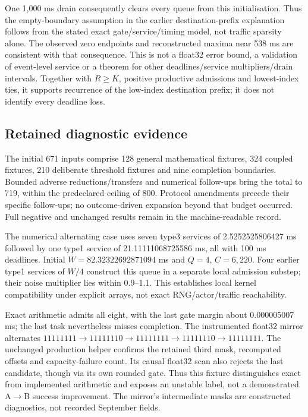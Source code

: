 \documentclass[12pt,a4paper]{article}
\begin{document}
One 1,000 ms drain consequently clears every queue from this initialisation. Thus the empty-boundary assumption in the earlier destination-prefix explanation follows from the stated exact gate/service/timing model, not traffic sparsity alone. The observed zero endpoints and reconstructed maxima near 538 ms are consistent with that consequence. This is not a float32 error bound, a validation of event-level service or a theorem for other deadlines/service multipliers/drain intervals. Together with $R\geq K$, positive productive admissions and lowest-index ties, it supports recurrence of the low-index destination prefix; it does not identify every deadline loss.

\FloatBarrier
\subsection{Retained diagnostic evidence}\label{sec:C.6}

The initial 671 inputs comprise 128 general mathematical fixtures, 324 coupled fixtures, 210 deliberate threshold fixtures and nine completion boundaries. Bounded adverse reductions/transfers and numerical follow-ups bring the total to 719, within the predeclared ceiling of 800. Protocol amendments precede their specific follow-ups; no outcome-driven expansion beyond that budget occurred. Full negative and unchanged results remain in the machine-readable record.

The numerical alternating case uses seven type3 services of 2.5252525806427 ms followed by one type1 service of 21.11111068725586 ms, all with 100 ms deadlines. Initial $W=82.32322692871094$ ms and $Q=4$, $C=6{,}220$. Four earlier type1 services of $W/4$ construct this queue in a separate local admission substep; their noise multiplier lies within 0.9--1.1. This establishes local kernel compatibility under explicit arrays, not exact RNG/actor/traffic reachability.

Exact arithmetic admits all eight, with the last gate margin about 0.000005007 ms; the last task nevertheless misses completion. The instrumented float32 mirror alternates $11111111\to11111110\to11111111\to11111110\to11111111$. The unchanged production helper confirms the retained third mask, recomputed offsets and capacity-failure count. Its causal float32 scan also rejects the last candidate, though via its own rounded gate. Thus this fixture distinguishes exact from implemented arithmetic and exposes an unstable label, not a demonstrated A\ensuremath{\to}B success improvement. The mirror's intermediate masks are constructed diagnostics, not recorded September fields.
\end{document}
